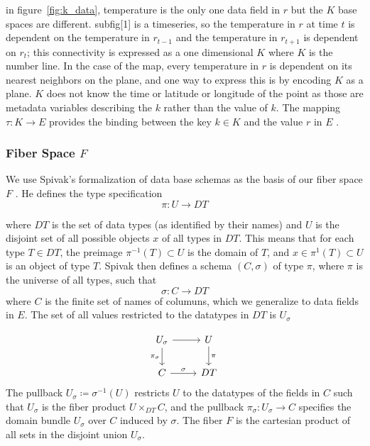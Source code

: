 \documentclass[../main.tex]{subfiles}
\begin{document}
in figure~\ref{fig:k_data}, temperature is the only one data field in $r$ but the $K$ base spaces are different. subfig[1] is a timeseries, so the temperature in $r$ at time $t$ is dependent on the temperature in $r_{t-1}$ and the temperature in $r_{t+1}$ is dependent on  $r_t$; this connectivity is expressed as a one dimensional $K$ where $K$ is the number line. In the case of the map, every temperature in $r$ is dependent on its nearest neighbors on the plane, and one way to express this is by encoding $K$ as a plane. $K$ does not know the time or latitude or longitude of the point as those are metadata variables describing the $k$ rather than the value of $k$. The mapping $\tau: K \rightarrow E$ provides the binding between the key $k \in K$ and the value $r$ in $E$ \cite{munznerChDataAbstraction}.

\subsubsection{Fiber Space $F$}
\label{sec:data_fiber}
We use Spivak's formalization of data base schemas as the basis of our fiber space $F$ \cite{spivakSIMPLICIALDATABASES}. He defines the type specification 
\begin{equation}
\pi: U \rightarrow DT
\end{equation}

where $DT$ is the set of data types (as identified by their names) and $U$ is the disjoint set of all possible objects $x$ of all types in $DT$. This means that for each type $T\in DT$, the preimage $\pi^{-1}(T)\subset U $ is the domain of $T$, and $x \in \pi^{1}(T)\subset U$ is an object of type $T$. Spivak then defines a schema $(C, \sigma)$ of type $\pi$, where $\pi$ is the universe of all types, such that 
\begin{equation}
\sigma: C \rightarrow DT
\end{equation}
where $C$ is the finite set of names of columuns, which we generalize to data fields in $E$. The set of all values restricted to the datatypes in $DT$ is $U_{\sigma}$

\begin{equation}
    \begin{tikzcd}
        U_{\sigma} \arrow[d, "\pi_{\sigma}"'] \arrow[r] & U \arrow[d, "\pi"] \\
        C \arrow[r, "\sigma"]                           & DT                
    \end{tikzcd}
\end{equation}
The pullback $U_{\sigma} \coloneqq \sigma^{-1}(U)$ restricts $U$ to the datatypes of the fields in $C$ such that $U_{\sigma}$ is the fiber product $U \times_{DT} C$, and the pullback $\pi_{\sigma}:U_{\sigma} \rightarrow C$ specifies the domain bundle $U_{\sigma}$ over $C$ induced by $\sigma$. The fiber $F$ is the cartesian product of all sets in the disjoint union $U_{\sigma}$. 
\end{document}
